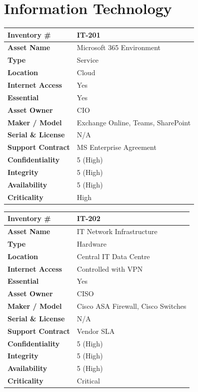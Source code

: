 \section*{Information Technology}

\begin{longtable}{|p{4cm}|p{9cm}|}
\hline
\textbf{Inventory \#} & \ac{IT}-201 \\\hline
\textbf{Asset Name} & Microsoft 365 Environment \\\hline
\textbf{Type} & Service \\\hline
\textbf{Location} & Cloud \\\hline
\textbf{Internet Access} & Yes \\\hline
\textbf{Essential} & Yes \\\hline
\textbf{Asset Owner} & \ac{CIO} \\\hline
\textbf{Maker / Model} & Exchange Online, Teams, SharePoint \\\hline
\textbf{Serial \& License} & N/A \\\hline
\textbf{Support Contract} & MS Enterprise Agreement \\\hline
\textbf{Confidentiality} & 5 (High) \\\hline
\textbf{Integrity} & 5 (High) \\\hline
\textbf{Availability} & 5 (High) \\\hline
\textbf{Criticality} & High \\\hline
\end{longtable}

\begin{longtable}{|p{4cm}|p{9cm}|}
\hline
\textbf{Inventory \#} & \ac{IT}-202 \\\hline
\textbf{Asset Name} & \ac{IT} Network Infrastructure \\\hline
\textbf{Type} & Hardware \\\hline
\textbf{Location} & Central \ac{IT} Data Centre \\\hline
\textbf{Internet Access} & Controlled with \ac{VPN} \\\hline
\textbf{Essential} & Yes \\\hline
\textbf{Asset Owner} & \ac{CISO} \\\hline
\textbf{Maker / Model} & Cisco ASA Firewall, Cisco Switches \\\hline
\textbf{Serial \& License} & N/A \\\hline
\textbf{Support Contract} & Vendor \ac{SLA} \\\hline
\textbf{Confidentiality} & 5 (High) \\\hline
\textbf{Integrity} & 5 (High) \\\hline
\textbf{Availability} & 5 (High) \\\hline
\textbf{Criticality} & Critical \\\hline
\end{longtable}

